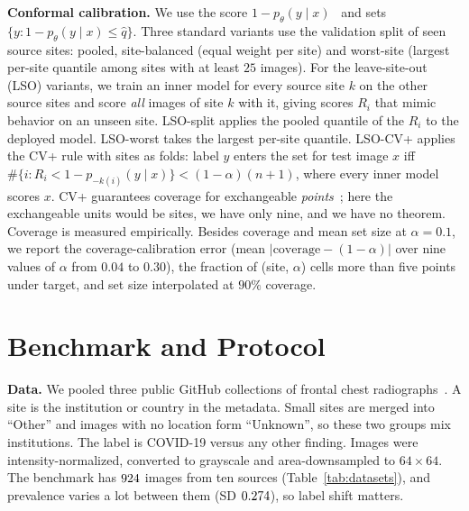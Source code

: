 \documentclass[10pt]{article}
\begin{document}
\textbf{Conformal calibration.} We use the score $1-p_\theta(y\mid x)$~\cite{sadinle2019least} and sets $\{y: 1-p_\theta(y\mid x)\le\hat q\}$. Three standard variants use the validation split of seen source sites: pooled, site-balanced (equal weight per site) and worst-site (largest per-site quantile among sites with at least $25$ images). For the leave-site-out (LSO) variants, we train an inner model for every source site $k$ on the other source sites and score \emph{all} images of site $k$ with it, giving scores $R_i$ that mimic behavior on an unseen site. LSO-split applies the pooled quantile of the $R_i$ to the deployed model. LSO-worst takes the largest per-site quantile. LSO-CV+ applies the CV+ rule with sites as folds: label $y$ enters the set for test image $x$ iff $\#\{i: R_i<1-p_{-k(i)}(y\mid x)\}<(1-\alpha)(n+1)$, where every inner model scores $x$. CV+ guarantees coverage for exchangeable \emph{points}~\cite{barber2021predictive}; here the exchangeable units would be sites, we have only nine, and we have no theorem. Coverage is measured empirically. Besides coverage and mean set size at $\alpha=0.1$, we report the coverage-calibration error (mean $|\text{coverage}-(1-\alpha)|$ over nine values of $\alpha$ from $0.04$ to $0.30$), the fraction of (site, $\alpha$) cells more than five points under target, and set size interpolated at $90\%$ coverage.

\section{Benchmark and Protocol}
\textbf{Data.} We pooled three public GitHub collections of frontal chest radiographs~\cite{cohen2020covid,chung2020actualmed,chung2020figure1}. A site is the institution or country in the metadata. Small sites are merged into ``Other'' and images with no location form ``Unknown'', so these two groups mix institutions. The label is COVID-19 versus any other finding. Images were intensity-normalized, converted to grayscale and area-downsampled to $64\times64$. The benchmark has $924$ images from ten sources (Table~\ref{tab:datasets}), and prevalence varies a lot between them (SD $0.274$), so label shift matters.
\begin{table}[t]\centering\scriptsize

\caption{Benchmark composition. Role is the fold role when the source is held out; Figure1 and Hannover-DE have too few negatives and are only used for training.}\label{tab:datasets}
\end{table}
\end{document}
